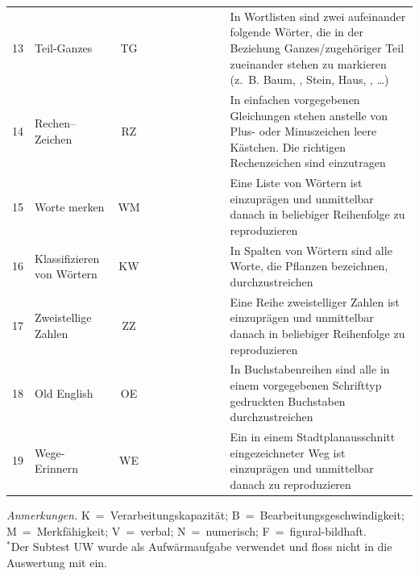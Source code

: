 \documentclass[11pt, twoside, a4paper]{book}		%
\begin{document}
\begin{table}
\begin{adjustbox}{width=\textwidth,totalheight=.9\textheight,keepaspectratio}
\begin{threeparttable}
\begin{tabular}{l l c c c c p{.0001cm} c c c p{20cm}}
				13				&	Teil-Ganzes				&	TG			&&	\checkmark	&&&\checkmark&&& In Wortlisten sind zwei aufeinander folgende Wörter, die in der Beziehung Ganzes/zugehöriger Teil zueinander stehen zu markieren (z.~B. Baum, \cancel{Blatt}, Stein, Haus, \cancel{Dach}, \ldots)\\
				14				&	Rechen--Zeichen			&	RZ			&&	\checkmark	&&&&\checkmark&& In  einfachen vorgegebenen Gleichungen stehen anstelle von Plus- oder Minuszeichen leere Kästchen. Die richtigen Rechenzeichen sind einzutragen\\
				15				&	Worte merken			&	WM			&&&	\checkmark	&&\checkmark&&& Eine Liste von Wörtern ist einzuprägen und unmittelbar danach in beliebiger Reihenfolge zu reproduzieren\\ 
				16				&	Klassifizieren von Wörtern&	KW			&&	\checkmark	&&&\checkmark&&& In Spalten von Wörtern sind alle Worte, die Pflanzen bezeichnen, durchzustreichen\\
				17				&	Zweistellige Zahlen		&	ZZ			&&&	\checkmark	&&&\checkmark&& Eine Reihe zweistelliger Zahlen ist einzuprägen und unmittelbar danach in beliebiger Reihenfolge zu reproduzieren\\
				18				&	Old English				&	OE			&&	\checkmark	&&&&&\checkmark& In Buchstabenreihen sind alle in einem vorgegebenen Schrifttyp gedruckten Buchstaben durchzustreichen\\
				19				&	Wege-Erinnern			&	WE			&&&	\checkmark	&&&&\checkmark& Ein in einem Stadtplanausschnitt eingezeichneter Weg ist einzuprägen und unmittelbar danach zu reproduzieren\\
				
				\hline
			\end{tabular}
			
			\begin{tablenotes}[flushleft]
				\footnotesize				%
				\setlength{}	%
				\item \textit{Anmerkungen.} K~=~Verarbeitungskapazität; B~=~Bearbeitungsgeschwindigkeit; M~=~Merkfähigkeit; V~=~verbal; N~=~numerisch; F~=~figural-bildhaft.\\
				{$^*$}Der Subtest UW wurde als Aufwärmaufgabe verwendet und floss nicht in die Auswertung mit ein.
			\end{tablenotes}
		\end{threeparttable}
	\end{adjustbox}
\end{table}
\end{document}
